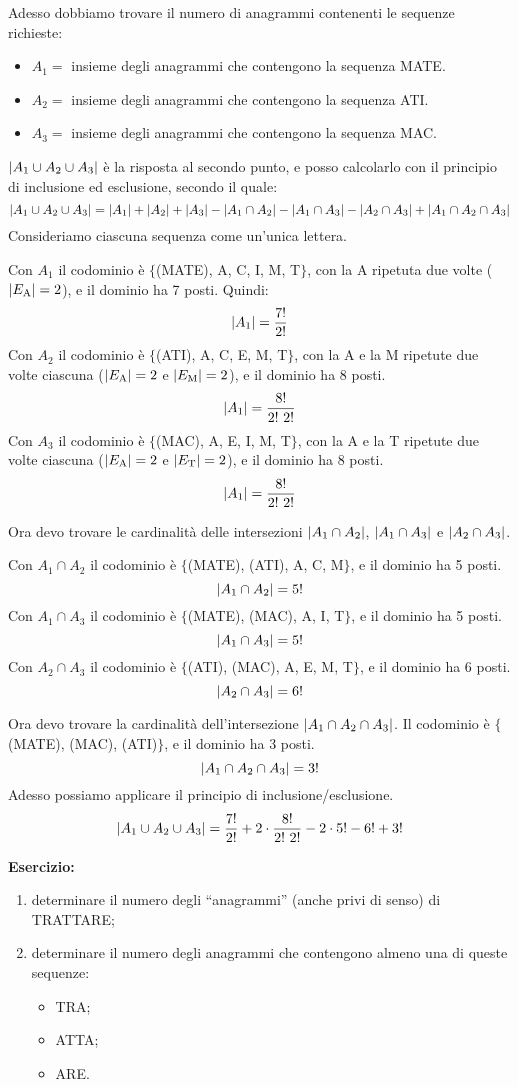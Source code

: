 Adesso dobbiamo trovare il numero di anagrammi contenenti le sequenze richieste:
\begin{itemize}
  \item $A_1 = $ insieme degli anagrammi che contengono la sequenza MATE.
  \item $A_2 = $ insieme degli anagrammi che contengono la sequenza ATI.
  \item $A_3 = $ insieme degli anagrammi che contengono la sequenza MAC.
\end{itemize}
$\left\lvert{A_1 \cup A_2 \cup A_3}\right\rvert$ \`e la risposta al secondo punto, e posso calcolarlo con il principio di inclusione ed esclusione, secondo il quale:
\[
\left\lvert{A_1 \cup A_2 \cup A_3}\right\rvert = \left\lvert{A_1}\right\rvert + \left\lvert{A_2}\right\rvert + \left\lvert{A_3}\right\rvert - \left\lvert{A_1 \cap A_2}\right\rvert - \left\lvert{A_1 \cap A_3}\right\rvert - \left\lvert{A_2 \cap A_3}\right\rvert + \left\lvert{A_1 \cap A_2 \cap A_3}\right\rvert
\]
Consideriamo ciascuna sequenza come un'unica lettera. 

Con $A_1$ il codominio \`e $\{ $(MATE), A, C, I, M, T$\}$, con la A ripetuta due volte ($\left\lvert{E_{\text{A}}}\right\rvert = 2$), e il dominio ha 7 posti. Quindi:
\[
\left\lvert{A_1}\right\rvert = \frac{7!}{2!}
\]
Con $A_2$ il codominio \`e $\{ $(ATI), A, C, E, M, T$\}$, con la A e la M ripetute due volte ciascuna ($\left\lvert{E_{\text{A}}}\right\rvert = 2$ e $\left\lvert{E_{\text{M}}}\right\rvert = 2$), e il dominio ha 8 posti.
\[
\abs{A_1} = \frac{8!}{2! \ 2!}
\]
Con $A_3$ il codominio \`e $\{ $(MAC), A, E, I, M, T$\}$, con la A e la T ripetute due volte ciascuna ($\left\lvert{E_{\text{A}}}\right\rvert = 2$ e $\left\lvert{E_{\text{T}}}\right\rvert = 2$), e il dominio ha 8 posti.
\[
\abs{A_1} = \frac{8!}{2! \ 2!}
\]

Ora devo trovare le cardinalit\`a delle intersezioni $\left\lvert{A_1 \cap A_2}\right\rvert$, $\left\lvert{A_1 \cap A_3}\right\rvert$ e $\left\lvert{A_2 \cap A_3}\right\rvert$.

Con $A_1 \cap A_2$ il codominio \`e $\{ $(MATE), (ATI), A, C, M$\}$, e il dominio ha 5 posti.
\[
\left\lvert{A_1 \cap A_2}\right\rvert = 5!
\]
Con $A_1 \cap A_3$ il codominio \`e $\{ $(MATE), (MAC), A, I, T$\}$, e il dominio ha 5 posti.
\[
\left\lvert{A_1 \cap A_3}\right\rvert = 5!
\]
Con $A_2 \cap A_3$ il codominio \`e $\{ $(ATI), (MAC), A, E, M, T$\}$, e il dominio ha 6 posti.
\[
\left\lvert{A_2 \cap A_3}\right\rvert = 6!
\]

Ora devo trovare la cardinalit\`a dell'intersezione $\left\lvert{A_1 \cap A_2 \cap A_3}\right\rvert$. Il codominio \`e $\{ $(MATE), (MAC), (ATI)$\}$, e il dominio ha 3 posti.
\[
\left\lvert{A_1 \cap A_2 \cap A_3}\right\rvert = 3!
\]
Adesso possiamo applicare il principio di inclusione/esclusione.
\[
\left\lvert{A_1 \cup A_2 \cup A_3}\right\rvert = 
\frac{7!}{2!} + 2 \cdot \frac{8!}{2! \ 2!} - 2 \cdot 5! - 6! + 3!
\]

\textbf{Esercizio:} 
\begin{enumerate}
  \item determinare il numero degli ``anagrammi'' (anche privi di senso) di TRATTARE;
  \item determinare il numero degli anagrammi che contengono almeno una di queste sequenze:
  \begin{itemize}
    \item TRA;
    \item ATTA;
    \item ARE.
  \end{itemize}
\end{enumerate}

